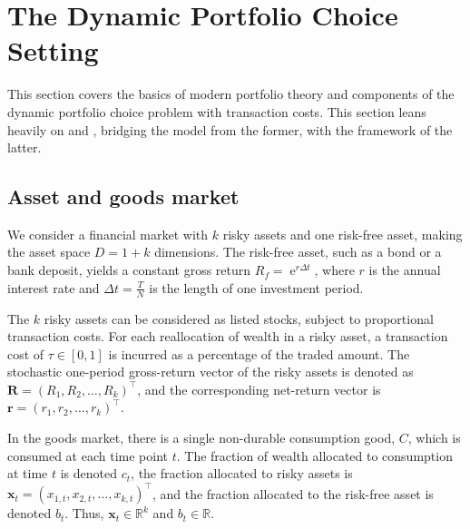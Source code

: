 \documentclass[11pt]{article}
\begin{document}
\fi

\section{The Dynamic Portfolio Choice Setting} \label{Section: Economic-theory}
This section covers the basics of modern portfolio theory and components of the dynamic portfolio choice problem with transaction costs.
This section leans heavily on \textcite{CaiJuddXu2020} and \textcite{Scheidegger2023},
bridging the model from the former, with the framework of the latter.

\subsection{Asset and goods market} \label{Subsection: Market}
We consider a financial market with \(k\) risky assets and one risk-free asset, making the asset space \(D = 1 + k\) dimensions. 
The risk-free asset, such as a bond or a bank deposit, yields a constant gross return \(R_f = \operatorname{e}^{r\Delta t}\), 
where \(r\) is the annual interest rate and \(\Delta t = \frac{T}{N}\) is the length of one investment period. 

The \(k\) risky assets can be considered as listed stocks, subject to proportional transaction costs. 
For each reallocation of wealth in a risky asset, a transaction cost of \(\tau \in [0,1]\)
is incurred as a percentage of the traded amount. 
The stochastic one-period gross-return vector of the risky assets is denoted as
\(\mathbf{R} = (R_1, R_2, \ldots, R_k)^\top\), and the corresponding net-return vector is
\(\mathbf{r} = (r_1, r_2, \ldots, r_k)^\top\).

In the goods market, there is a single non-durable consumption good, \(C\), which is consumed at each time point \(t\). 
The fraction of wealth allocated to consumption at time \(t\) is denoted \(c_t\),
the fraction allocated to risky assets is \(\mathbf{x}_t = (x_{1,t}, x_{2,t}, \dots, x_{k,t})^\top\),
and the fraction allocated to the risk-free asset is denoted \(b_t\). 
Thus, \(\mathbf{x}_t \in \mathbb{R}^k\) and \(b_t \in \mathbb{R}\).
\end{document}
